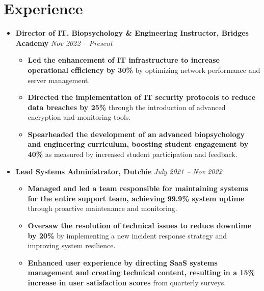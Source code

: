 \documentclass[a4paper,10pt]{article}
\begin{document}
\section*{Experience}
\begin{itemize}[leftmargin=0cm, itemsep=0pt]
    \item \textbf{Director of IT, Biopsychology \& Engineering Instructor, Bridges Academy}
        \hfill \textit{Nov 2022 – Present}
        \begin{itemize}[leftmargin=0.5cm, itemsep=0pt]
            \item \textbf{Led the enhancement of IT infrastructure to increase operational efficiency by 30\%} by optimizing network performance and server management.
            \item \textbf{Directed the implementation of IT security protocols to reduce data breaches by 25\%} through the introduction of advanced encryption and monitoring tools.
            \item \textbf{Spearheaded the development of an advanced biopsychology and engineering curriculum, boosting student engagement by 40\%} as measured by increased student participation and feedback.
        \end{itemize}

    \item \textbf{Lead Systems Administrator, Dutchie}
        \hfill \textit{July 2021 – Nov 2022}
        \begin{itemize}[leftmargin=0.5cm, itemsep=0pt]
            \item \textbf{Managed and led a team responsible for maintaining systems for the entire support team, achieving 99.9\% system uptime} through proactive maintenance and monitoring.
            \item \textbf{Oversaw the resolution of technical issues to reduce downtime by 20\%} by implementing a new incident response strategy and improving system resilience.
            \item \textbf{Enhanced user experience by directing SaaS systems management and creating technical content, resulting in a 15\% increase in user satisfaction scores} from quarterly surveys.
        \end{itemize}


\end{itemize}
\end{document}
